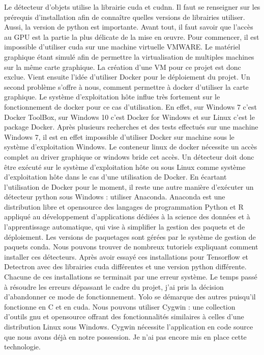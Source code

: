 \documentclass[debug,nodate,hideweeklyreports,noposter]{polytech/polytech}
\begin{document}
Le détecteur d’objets utilise la librairie \gls{cuda} et \gls{cudnn}. Il faut se renseigner sur les prérequis d’installation afin de connaître quelles versions de librairies utiliser. Aussi, la version de python est importante.
Avant tout, il faut savoir que l’accès au GPU est la partie la plus délicate de la mise en œuvre. 
Pour commencer, il est impossible d’utiliser \gls{cuda} sur une machine virtuelle VMWARE. Le matériel graphique étant simulé afin de permettre la virtualisation de multiples machines sur la même carte graphique.
La création d’une VM pour ce projet est donc exclue.
Vient ensuite l’idée d’utiliser Docker pour le déploiement du projet. Un second problème s’offre à nous, comment permettre à docker d’utiliser la carte graphique. Le système d’exploitation hôte influe très fortement sur le fonctionnement de docker pour ce cas d’utilisation. En effet, sur Windows 7 c’est Docker ToolBox, sur Windows 10 c’est Docker for Windows et sur Linux c’est le package Docker.
Après plusieurs recherches et des tests effectués sur une machine Windows 7, il est en effet impossible d’utiliser Docker sur machine sous le système d’exploitation Windows. Le conteneur linux de docker nécessite un accès complet au driver graphique or windows bride cet accès.
Un détecteur doit donc être exécuté sur le système d’exploitation hôte ou sous Linux comme système d’exploitation hôte dans le cas d’une utilisation de Docker.
En écartant l’utilisation de Docker pour le moment, il reste une autre manière d’exécuter un détecteur python sous Windows : utiliser Anaconda.
Anaconda est une distribution libre et \gls{opensource} des langages de programmation Python et R appliqué au développement d'applications dédiées à la science des données et à l'apprentissage automatique, qui vise à simplifier la gestion des paquets et de déploiement. Les versions de paquetages sont gérées par le système de gestion de paquets conda.
Nous pouvons trouver de nombreux tutoriels expliquant comment installer ces détecteurs. Après avoir essayé ces installations pour Tensorflow et Detectron avec des librairies \gls{cuda} différentes et une version python différente. Chacune de ces installations se terminait par une erreur système. Le temps passé à résoudre les erreurs dépassant le cadre du projet, j’ai pris la décision d’abandonner ce mode de fonctionnement.
Yolo se démarque des autres puisqu’il fonctionne en C et en \gls{cuda}. Nous pouvons utiliser Cygwin : une collection d'outils \gls{gnu} et \gls{opensource} offrant des fonctionnalités similaires à celles d'une distribution Linux sous Windows. Cygwin nécessite l’application en code source que nous avons déjà en notre possession. Je n’ai pas encore mis en place cette technologie.
\end{document}
